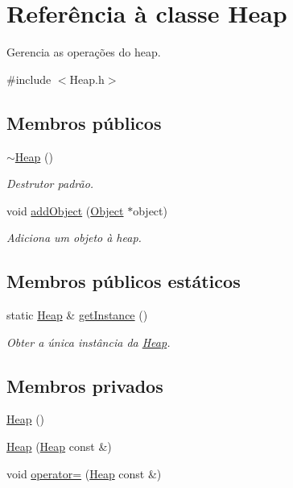 \hypertarget{classHeap}{}\section{Referência à classe Heap}
\label{classHeap}


Gerencia as operações do heap.  




{\ttfamily \#include $<$Heap.\+h$>$}

\subsection*{Membros públicos}
\begin{DoxyCompactItemize}
\item 
\hyperlink{classHeap_a734051272cbd0945d3916a1a89707ba2}{$\sim$\+Heap} ()
\begin{DoxyCompactList}\small\item\em Destrutor padrão. \end{DoxyCompactList}\item 
void \hyperlink{classHeap_aa2a5f92b36abe24c83853feca936548e}{add\+Object} (\hyperlink{classObject}{Object} $\ast$object)
\begin{DoxyCompactList}\small\item\em Adiciona um objeto à heap. \end{DoxyCompactList}\end{DoxyCompactItemize}
\subsection*{Membros públicos estáticos}
\begin{DoxyCompactItemize}
\item 
static \hyperlink{classHeap}{Heap} \& \hyperlink{classHeap_ac030780aeff8a27e33ed5f5eb576dfda}{get\+Instance} ()
\begin{DoxyCompactList}\small\item\em Obter a única instância da \hyperlink{classHeap}{Heap}. \end{DoxyCompactList}\end{DoxyCompactItemize}
\subsection*{Membros privados}
\begin{DoxyCompactItemize}
\item 
\hyperlink{classHeap_a6595efd3562a6334d2f5471c2b3b7cb4}{Heap} ()
\item 
\hyperlink{classHeap_aac9a075f0c23c3923fabbf2093386089}{Heap} (\hyperlink{classHeap}{Heap} const \&)
\item 
void \hyperlink{classHeap_a2923f4b4b05267583815e185f2e28b7d}{operator=} (\hyperlink{classHeap}{Heap} const \&)
\end{DoxyCompactItemize}
